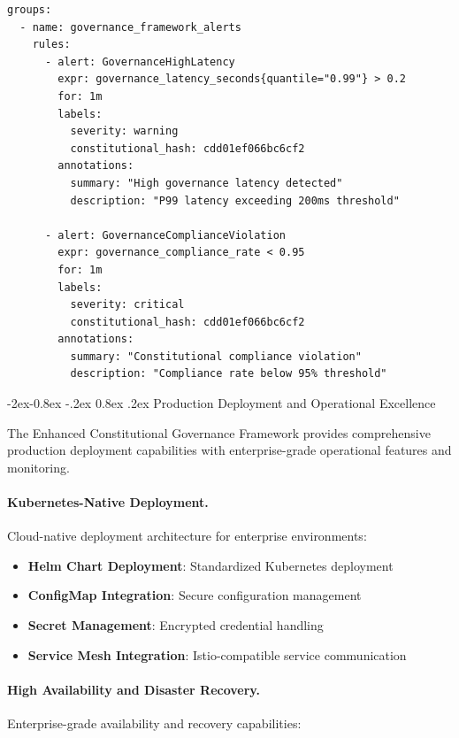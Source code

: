 \documentclass[manuscript,screen,9pt]{acmart}
\makeatletter
\renewcommand\subsubsection{\@startsection{subsubsection}{3}{\z@}%
  {-2ex\@plus -0.8ex \@minus -.2ex}%
  {0.8ex \@plus .2ex}%
  {\normalfont\normalsize\bfseries}}
\makeatother
\begin{document}
\begin{lstlisting}[caption=Prometheus Alerting Rules, label=lst:prometheus_alerts]
groups:
  - name: governance_framework_alerts
    rules:
      - alert: GovernanceHighLatency
        expr: governance_latency_seconds{quantile="0.99"} > 0.2
        for: 1m
        labels:
          severity: warning
          constitutional_hash: cdd01ef066bc6cf2
        annotations:
          summary: "High governance latency detected"
          description: "P99 latency exceeding 200ms threshold"

      - alert: GovernanceComplianceViolation
        expr: governance_compliance_rate < 0.95
        for: 1m
        labels:
          severity: critical
          constitutional_hash: cdd01ef066bc6cf2
        annotations:
          summary: "Constitutional compliance violation"
          description: "Compliance rate below 95% threshold"
\end{lstlisting}

\subsubsection{Production Deployment and Operational Excellence}
\label{subsubsec:production_deployment}

The Enhanced Constitutional Governance Framework provides comprehensive production deployment capabilities with enterprise-grade operational features and monitoring.

\paragraph{Kubernetes-Native Deployment.}
Cloud-native deployment architecture for enterprise environments:

\begin{itemize}[itemsep=1pt,parsep=1pt]
    \item \textbf{Helm Chart Deployment}: Standardized Kubernetes deployment
    \item \textbf{ConfigMap Integration}: Secure configuration management
    \item \textbf{Secret Management}: Encrypted credential handling
    \item \textbf{Service Mesh Integration}: Istio-compatible service communication
\end{itemize}

\paragraph{High Availability and Disaster Recovery.}
Enterprise-grade availability and recovery capabilities:
\end{document}
